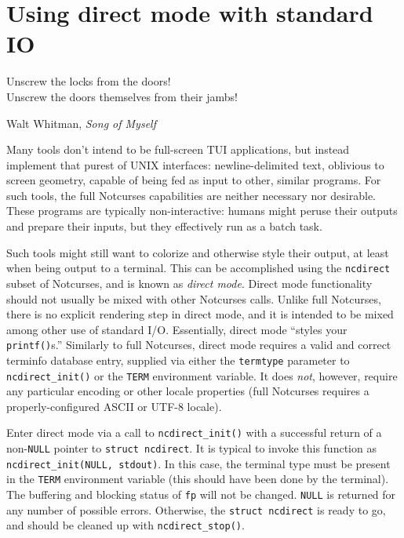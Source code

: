 \documentclass[letterpaper,10pt]{article}
\begin{document}
\section{Using direct mode with standard I\/O}
\label{sec:direct}
\epigraph{Unscrew the locks from the doors!\\Unscrew the doors themselves from their jambs!}{Walt Whitman, \textit{Song of Myself}}
Many tools don't intend to be full-screen TUI applications, but instead
implement that purest of UNIX interfaces: newline-delimited text, oblivious
to screen geometry, capable of being fed as input to other, similar programs.
For such tools, the full Notcurses capabilities are neither necessary nor
desirable. These programs are typically non-interactive: humans might peruse
their outputs and prepare their inputs, but they effectively run as a batch
task.

 Such tools might still want to colorize and otherwise style their output, at
least when being output to a terminal. This can be accomplished using the
\texttt{ncdirect} subset of Notcurses, and is known as \textit{direct mode}. Direct
mode functionality should not usually be mixed with other Notcurses calls.
Unlike full Notcurses, there is no explicit rendering step in direct mode, and
it is intended to be mixed among other use of standard I/O. Essentially, direct
mode ``styles your \texttt{printf()}s.'' Similarly to full Notcurses, direct mode
requires a valid and correct terminfo database entry, supplied via either the
\texttt{termtype} parameter to \texttt{ncdirect\_init()} or the \texttt{TERM} environment
variable. It does \textit{not}, however, require any particular encoding or
other locale properties\cite{setlocale} (full Notcurses requires a
properly-configured ASCII or UTF-8 locale).

Enter direct mode via a call to \texttt{ncdirect\_init()} with a successful
return of a non-\texttt{NULL} pointer to \texttt{struct ncdirect}. It is
typical to invoke this function as \texttt{ncdirect\_init(NULL, stdout)}. In this case, the terminal type must be present in the
\texttt{TERM} environment variable (this should have been done by the
terminal). The buffering and blocking status of \texttt{fp} will not be
changed. \texttt{NULL} is returned for any number of possible errors.
Otherwise, the \texttt{struct ncdirect} is ready to go, and should be cleaned
up with \texttt{ncdirect\_stop()}.
\end{document}
